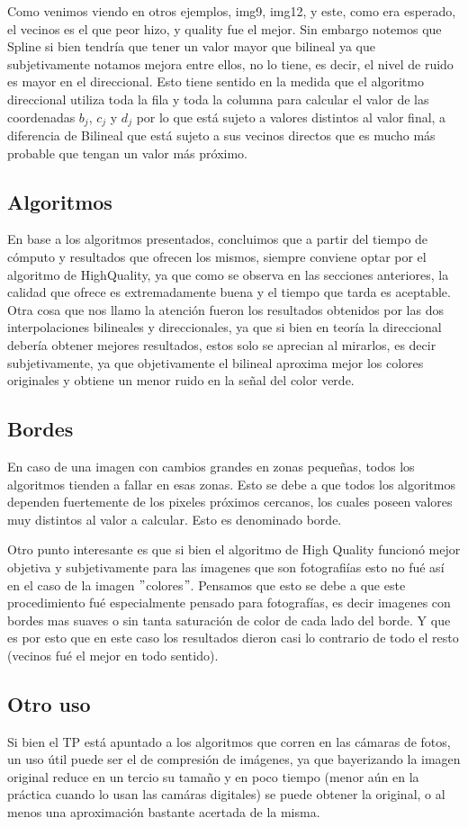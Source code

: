 Como venimos viendo en otros ejemplos, img9, img12, y este, como era esperado, el vecinos es el que peor hizo, y quality fue el mejor. Sin embargo notemos que Spline si bien 
tendría que tener un valor mayor que bilineal ya que subjetivamente notamos mejora entre ellos, no lo tiene, es 
decir, el nivel de ruido es mayor en el direccional. Esto tiene sentido en la medida que el algoritmo direccional 
utiliza toda la fila y toda la columna para calcular el valor de las coordenadas $b_j$, $c_j$ y $d_j$ por lo que está 
sujeto a valores distintos al valor final, a diferencia de Bilineal que está sujeto a sus vecinos directos que es 
mucho más probable que tengan un valor más próximo. 


\subsection{Algoritmos}
En base a los algoritmos presentados, concluimos que a partir del tiempo de cómputo y resultados que ofrecen los mismos, siempre conviene optar por el algoritmo de HighQuality, ya que como se observa en las secciones anteriores, la calidad que ofrece es extremadamente buena y el tiempo que tarda es aceptable.
Otra cosa que nos llamo la atención fueron los resultados obtenidos por las dos interpolaciones bilineales y direccionales, ya que si bien en teoría la direccional debería obtener mejores resultados, estos solo se aprecian al mirarlos, es decir subjetivamente, ya que objetivamente el bilineal aproxima mejor los colores originales y obtiene un menor ruido en la señal del color verde.

\subsection{Bordes}
En caso de una imagen con cambios grandes en zonas pequeñas, todos los algoritmos tienden a fallar en esas zonas.
Esto se debe a que todos los algoritmos dependen fuertemente de los pixeles próximos cercanos, los cuales poseen valores muy distintos al valor a calcular. Esto es denominado borde.

Otro punto interesante es que si bien el algoritmo de High Quality funcionó mejor objetiva y subjetivamente para las imagenes que son fotografiías esto no fué así en el caso de la imagen $"$colores$"$. Pensamos que esto se debe a que este procedimiento fué especialmente pensado para fotografías, es decir imagenes con bordes mas suaves o sin tanta saturación de color de cada lado del borde. Y que es por esto que en este caso los resultados dieron casi lo contrario de todo el resto (vecinos fué el mejor en todo sentido).

\subsection{Otro uso}
Si bien el TP está apuntado a los algoritmos que corren en las cámaras de fotos, un uso útil puede ser el de compresión de imágenes, ya que bayerizando la imagen original reduce en un tercio su tamaño y en poco tiempo (menor aún en la práctica cuando lo usan las camáras digitales) se puede obtener la original, o al menos una aproximación bastante acertada de la misma.
